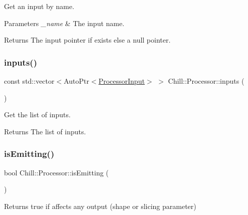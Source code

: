 Get an input by name. 
\begin{DoxyParams}{Parameters}
{\em \+\_\+name} & The input name. \\
\hline
\end{DoxyParams}
\begin{DoxyReturn}{Returns}
The input pointer if exists else a null pointer. 
\end{DoxyReturn}
\mbox{\label{class_chill_1_1_processor_ae31251f77eaca1c86fb326cac6833695}} 
\subsubsection{\texorpdfstring{inputs()}{inputs()}}
{\footnotesize\ttfamily const std\+::vector$<$Auto\+Ptr$<$\mbox{\hyperlink{class_chill_1_1_processor_input}{Processor\+Input}}$>$ $>$ Chill\+::\+Processor\+::inputs (\begin{DoxyParamCaption}{ }\end{DoxyParamCaption})\hspace{0.3cm}{\ttfamily [inline]}}

Get the list of inputs. \begin{DoxyReturn}{Returns}
The list of inputs. 
\end{DoxyReturn}
\mbox{\label{class_chill_1_1_processor_a209a0c41fc704874da8c2c10371d1b79}} 
\subsubsection{\texorpdfstring{is\+Emitting()}{isEmitting()}}
{\footnotesize\ttfamily bool Chill\+::\+Processor\+::is\+Emitting (\begin{DoxyParamCaption}{ }\end{DoxyParamCaption})\hspace{0.3cm}{\ttfamily [virtual]}}

\begin{DoxyReturn}{Returns}
true if affects any output (shape or slicing parameter) 
\end{DoxyReturn}
\mbox{\label{class_chill_1_1_processor_a8d35027206ef53bd40d2554f2f4b9046}} 
